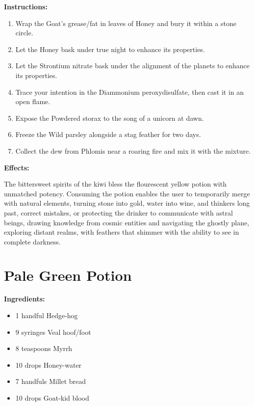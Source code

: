\documentclass{article}
\begin{document}
\textbf{Instructions:}

\begin{enumerate}
  \item Wrap the Goat's grease/fat in leaves of Honey and bury it within a stone circle.
  \item Let the Honey bask under true night to enhance its properties.
  \item Let the Strontium nitrate bask under the alignment of the planets to enhance its properties.
  \item Trace your intention in the Diammonium peroxydisulfate, then cast it in an open flame.
  \item Expose the Powdered storax to the song of a unicorn at dawn.
  \item Freeze the Wild parsley alongside a stag feather for two days.
  \item Collect the dew from Phlomis near a roaring fire and mix it with the mixture.
\end{enumerate}

\textbf{Effects:}

The bittersweet spirits of the kiwi bless the flourescent yellow potion with unmatched potency. Consuming the potion enables the user to temporarily merge with natural elements, turning stone into gold, water into wine, and thinkers long past, correct mistakes, or protecting the drinker to communicate with astral beings, drawing knowledge from cosmic entities and navigating the ghostly plane, exploring distant realms, with feathers that shimmer with the ability to see in complete darkness.

\newpage
\section*{Pale Green Potion}

\textbf{Ingredients:}

\begin{itemize}
  \item 1 handful Hedge-hog
  \item 9 syringes Veal hoof/foot
  \item 8 teaspoons Myrrh
  \item 10 drops Honey-water
  \item 7 handfuls Millet bread
  \item 10 drops Goat-kid blood
\end{itemize}
\end{document}
